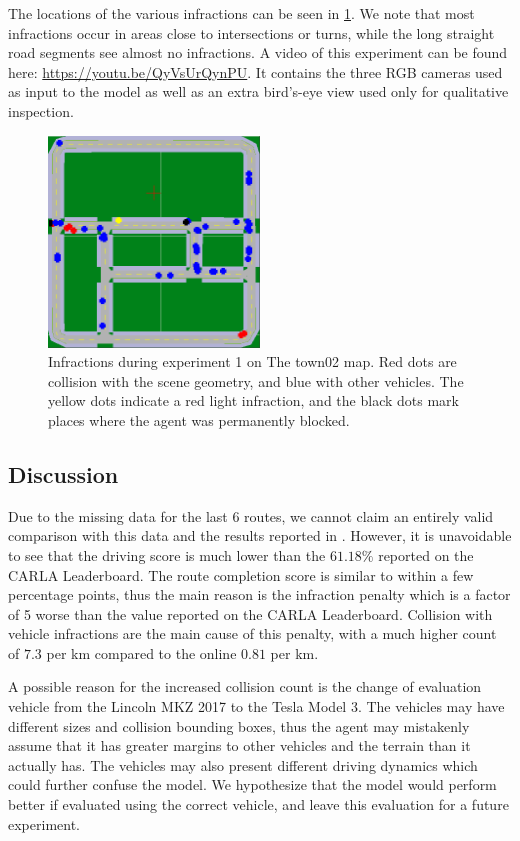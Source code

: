 The locations of the various infractions can be seen in \cref{fig:exp1:town02}.
We note that most infractions occur in areas close to intersections or turns,
while the long straight road segments see almost no infractions.
A video of this experiment can be found here: \url{https://youtu.be/QyVsUrQynPU}. It contains the three
RGB cameras used as input to the model as well as an extra bird's-eye view used 
only for qualitative inspection.

\begin{figure}
    \centering
    \includegraphics[width=0.5\textwidth]{figures/results/exp1-town02.png}
    \caption{Infractions during experiment 1 on The town02 map.
    Red dots are collision with the scene geometry,
    and blue with other vehicles.
    The yellow dots indicate a red light infraction,
    and the black dots mark places where the agent was permanently blocked.}
    \label{fig:exp1:town02}
\end{figure}


\subsection{Discussion}

Due to the missing data for the last 6 routes,
we cannot claim an entirely valid comparison with this data and the results reported in \cite{transfuser-pami}.
However, it is unavoidable to see that the driving score is much lower than the $61.18\%$ reported on the CARLA Leaderboard. 
The route completion score is similar to within a few percentage points,
thus the main reason is the infraction penalty which is a factor of 5 worse than the value reported on the CARLA Leaderboard.
Collision with vehicle infractions are the main cause of this penalty,
with a much higher count of $7.3$ per km compared to the online $0.81$ per km.

A possible reason for the increased collision count is the change of evaluation vehicle from
the Lincoln MKZ 2017 to the Tesla Model 3.
The vehicles may have different sizes and collision bounding boxes,
thus the agent may mistakenly assume that it has greater margins to other vehicles and the terrain
than it actually has.
The vehicles may also present different driving dynamics
which could further confuse the model.
We hypothesize that the model would perform better if evaluated using the correct vehicle,
and leave this evaluation for a future experiment.

